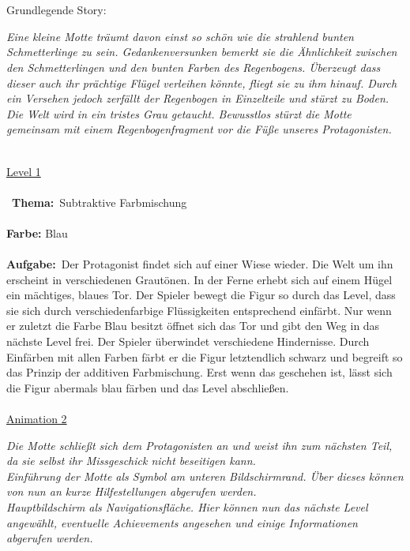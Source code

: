 \documentclass[10pt,a4paper,notitlepage]{report}
\begin{document}
	\\
	\\
		Grundlegende Story:\\
	\begin{flushright}
	\textit{Eine kleine Motte träumt davon einst so schön wie die strahlend bunten Schmetterlinge zu sein. Gedankenversunken bemerkt sie 
	die Ähnlichkeit zwischen den Schmetterlingen und den bunten Farben des Regenbogens. Überzeugt dass dieser auch ihr prächtige Flügel verleihen könnte, 
	fliegt sie zu ihm hinauf. Durch ein Versehen jedoch zerfällt der Regenbogen in Einzelteile und stürzt zu Boden. \\
	Die Welt wird in ein tristes Grau getaucht. Bewusstlos stürzt die Motte gemeinsam mit einem Regenbogenfragment vor die Füße unseres Protagonisten.}
	\end{flushright}\
	\\
	\underline{Level 1}\\\\\
	\textbf{Thema:}\
	Subtraktive Farbmischung
	\\\\
	\textbf{Farbe:} Blau\
	\\\\
	\textbf{Aufgabe:}\
		Der Protagonist findet sich auf einer Wiese wieder. Die Welt um ihn erscheint in verschiedenen Grautönen. In der Ferne erhebt sich auf einem Hügel ein 		mächtiges, blaues Tor. Der Spieler bewegt die Figur so durch das Level, dass sie sich durch verschiedenfarbige Flüssigkeiten entsprechend einfärbt. Nur wenn 		er zuletzt die Farbe Blau besitzt öffnet sich das Tor und gibt den Weg in das nächste Level frei. Der Spieler überwindet verschiedene Hindernisse. Durch 			Einfärben mit allen Farben färbt er die Figur letztendlich schwarz und begreift so das Prinzip der additiven Farbmischung. Erst wenn das geschehen ist, lässt sich 	die Figur abermals blau färben und das Level abschließen.
	\\\\
	\underline{Animation 2}\
	\\
	\begin{flushright}
	\textit{Die Motte schließt sich dem Protagonisten an und weist ihn zum nächsten Teil, da sie selbst ihr Missgeschick nicht beseitigen kann.\\
	Einführung der Motte als Symbol am unteren Bildschirmrand. Über dieses können von nun an kurze Hilfestellungen abgerufen werden.\\
	Hauptbildschirm als Navigationsfläche. Hier können nun das nächste Level angewählt, eventuelle Achievements angesehen und einige 
	Informationen abgerufen werden.}
	\end{flushright}\
\end{document}
